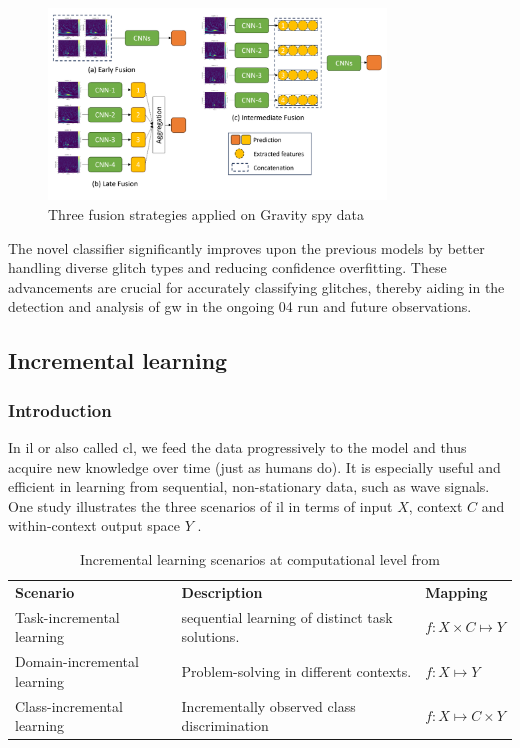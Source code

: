 \begin{figure}[ht]
    \centering
    \includegraphics[width=0.8\textwidth]{Grad Assignment/Images/fusion_strategies_O4.png}
    \caption{Three fusion strategies applied on Gravity spy data \citep{wu2024advancing}}
    \label{fig:fusionStrategies04}
\end{figure}
The novel classifier significantly improves upon the previous models by better handling diverse glitch types and reducing confidence overfitting. These advancements are crucial for accurately classifying glitches, thereby aiding in the detection and analysis of \acrshort{gw} in the ongoing 04 run and future observations. 
\newpage
\subsection{Incremental learning}
\label{ref:sub_incremental}
\subsubsection{Introduction}
In \acrshort{il} or also called \acrshort{cl}, we feed the data progressively to the model and thus acquire new knowledge over time (just as humans do). It is especially useful and efficient in learning from sequential, non-stationary data, such as wave signals. One study illustrates the three scenarios of \acrshort{il} in terms of input $X$, context $C$ and within-context output space $Y$ \citep{van2022three}. 

\begin{table}[H]
\begin{tabularx}{0.9\textwidth}{l | X | l}
    \textbf{Scenario} & \textbf{Description} & \textbf{Mapping} \\
     Task-incremental learning & sequential learning of distinct task solutions. & $f:X\times C \mapsto Y$  \\
     Domain-incremental learning & Problem-solving in different contexts.&$f:X\mapsto Y$\\
     Class-incremental learning & Incrementally observed class discrimination & $f:X\mapsto C\times Y$

\end{tabularx}
     \caption{Incremental learning scenarios at computational level from \citep{van2022three}}
     \label{tab:incr_learning}
\end{table}

